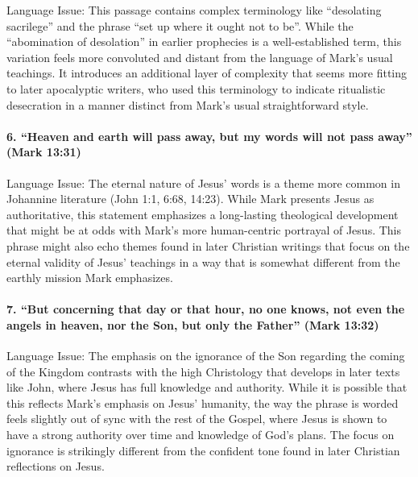 Language Issue: This passage contains complex terminology like ``desolating sacrilege'' and the phrase ``set up where it ought not to be''.
While the ``abomination of desolation'' in earlier prophecies is a well-established term, this variation feels more convoluted and distant from the language of Mark's usual teachings.
It introduces an additional layer of complexity that seems more fitting to later apocalyptic writers, who used this terminology to indicate ritualistic desecration in a manner distinct from Mark's usual straightforward style.

\paragraph{6.
``Heaven and earth will pass away, but my words will not pass away'' (Mark 13:31)}\label{par:heaven-and-earth-will-pass-away-but-my-words-will-not-pass-away-mark-1331}

Language Issue: The eternal nature of Jesus' words is a theme more common in Johannine literature (John 1:1, 6:68, 14:23).
While Mark presents Jesus as authoritative, this statement emphasizes a long-lasting theological development that might be at odds with Mark's more human-centric portrayal of Jesus.
This phrase might also echo themes found in later Christian writings that focus on the eternal validity of Jesus' teachings in a way that is somewhat different from the earthly mission Mark emphasizes.

\paragraph{7.
``But concerning that day or that hour, no one knows, not even the angels in heaven, nor the Son, but only the Father'' (Mark 13:32)}\label{par:but-concerning-that-day-or-that-hour-no-one-knows-not-even-the-angels-in-heaven-nor-the-son-but-only-the-father-mark-1332}

Language Issue: The emphasis on the ignorance of the Son regarding the coming of the Kingdom contrasts with the high Christology that develops in later texts like John, where Jesus has full knowledge and authority.
While it is possible that this reflects Mark's emphasis on Jesus' humanity, the way the phrase is worded feels slightly out of sync with the rest of the Gospel, where Jesus is shown to have a strong authority over time and knowledge of God's plans.
The focus on ignorance is strikingly different from the confident tone found in later Christian reflections on Jesus.

